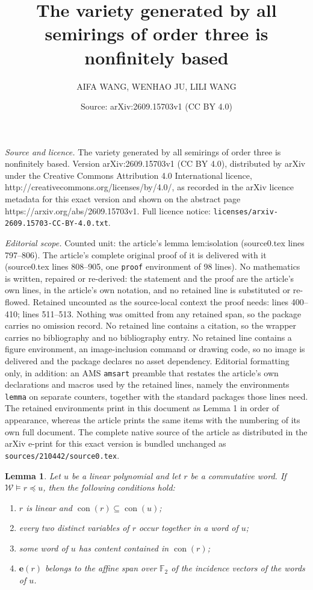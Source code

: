 \documentclass[10pt,a4paper]{amsart}
\title{The variety generated by all semirings of order three is nonfinitely based}
\author{AIFA WANG, WENHAO JU, LILI WANG}
\date{Source: arXiv:2609.15703v1 (CC BY 4.0)}
\newtheorem{lemma}{Lemma}
\newcommand{\F}{\mathbb F_2}
\newcommand{\W}{\mathcal W}
\DeclareMathOperator{\con}{con}
\newcommand{\ivec}[1]{\mathbf e(#1)}
\begin{document}
\maketitle

\noindent\emph{Source and licence.} The variety generated by all semirings of order three is nonfinitely based. Version arXiv:2609.15703v1 (CC BY 4.0), distributed by arXiv under the Creative Commons Attribution 4.0 International licence, http://creativecommons.org/licenses/by/4.0/, as recorded in the arXiv licence metadata for this exact version and shown on the abstract page https://arxiv.org/abs/2609.15703v1. Full licence notice: \texttt{licenses/arxiv-2609.15703-CC-BY-4.0.txt}.\par\smallskip

\noindent\textit{Editorial scope.} Counted unit: the article's lemma lem:isolation (source0.tex lines 797--806). The article's complete original proof of it is delivered with it (source0.tex lines 808--905, one \texttt{proof} environment of 98 lines). No mathematics is written, repaired or re-derived: the statement and the proof are the article's own lines, in the article's own notation, and no retained line is substituted or re-flowed.  Retained uncounted as the source-local context the proof needs: lines 400--410; lines 511--513.  Nothing was omitted from any retained span, so the package carries no omission record.  No retained line contains a citation, so the wrapper carries no bibliography and no bibliography entry.  No retained line contains a figure environment, an image-inclusion command or drawing code, so no image is delivered and the package declares no asset dependency.  Editorial formatting only, in addition: an AMS \texttt{amsart} preamble that restates the article's own declarations and macros used by the retained lines, namely the environments \texttt{lemma} on separate counters, together with the standard packages those lines need.  The retained environments print in this document as Lemma 1 in order of appearance, whereas the article prints the same items with the numbering of its own full document.  The complete native source of the article as distributed in the arXiv e-print for this exact version is bundled unchanged as \texttt{sources/210442/source0.tex}.
\begin{lemma}\label{lem:tests}
Let $u$ be a linear polynomial and let $r$ be a commutative word.
If $\W\models r\preceq u$, then the following conditions hold:
\begin{enumerate}
\item $r$ is linear and $\con(r)\subseteq\con(u)$;
\item every two distinct variables of $r$ occur together in a word of $u$;
\item some word of $u$ has content contained in $\con(r)$;
\item $\ivec{r}$ belongs to the affine span over $\F$ of the incidence
vectors of the words of $u$.
\end{enumerate}
\end{lemma}
\end{document}
